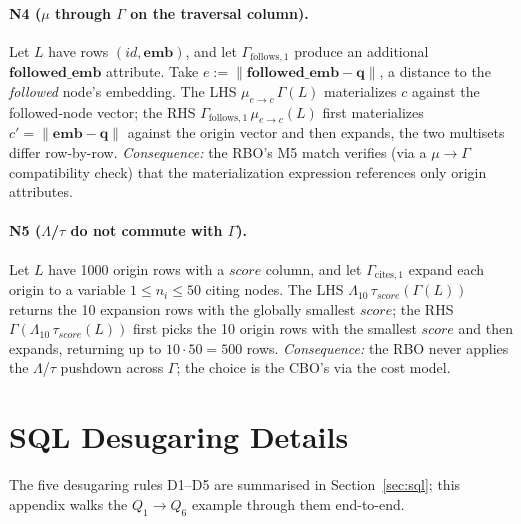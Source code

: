 \documentclass[sigconf]{acmart}
\theoremstyle{plain}
\theoremstyle{definition}
\newcommand{\vect}[1]{\boldsymbol{#1}}
\theoremstyle{remark}
\begin{document}
\paragraph{N4 ($\mu$ through $\Gamma$ on the traversal column).}
Let $L$ have rows $(\mathit{id}, \vect{emb})$, and let
$\Gamma_{\mathrm{follows},1}$ produce an additional
$\vect{followed\_emb}$ attribute. Take
$e:= \lVert \vect{followed\_emb} - \vect{q} \rVert$, a distance to
the \emph{followed} node's embedding. The LHS
$\mu_{e \to c}\,\Gamma(L)$ materializes $c$ against the followed-node
vector; the RHS $\Gamma_{\mathrm{follows},1}\,\mu_{e \to c}(L)$ first
materializes $c' = \lVert \vect{emb} - \vect{q} \rVert$ against the
origin vector and then expands, the two multisets differ
row-by-row. \emph{Consequence:} the RBO's M5 match verifies
(via a $\mu \to \Gamma$ compatibility check) that the materialization
expression references only origin attributes.

\paragraph{N5 ($\Lambda$/$\tau$ do not commute with $\Gamma$).}
Let $L$ have 1000 origin rows with a $\mathit{score}$ column, and let
$\Gamma_{\mathrm{cites},1}$ expand each origin to a variable
$1 \leq n_i \leq 50$ citing nodes. The LHS
$\Lambda_{10}\, \tau_{\mathit{score}}(\Gamma(L))$ returns the 10
expansion rows with the globally smallest $\mathit{score}$; the RHS
$\Gamma(\Lambda_{10}\, \tau_{\mathit{score}}(L))$ first picks the 10
origin rows with the smallest $\mathit{score}$ and then expands,
returning up to $10 \cdot 50 = 500$ rows. \emph{Consequence:} the
RBO never applies the $\Lambda$/$\tau$ pushdown across $\Gamma$;
the choice is the CBO's via the cost model.



\section{SQL Desugaring Details}\label{app:sql}

The five desugaring rules D1--D5 are summarised in
Section~\ref{sec:sql}; this appendix walks the $Q_1 \to Q_6$
example through them end-to-end.
\end{document}
